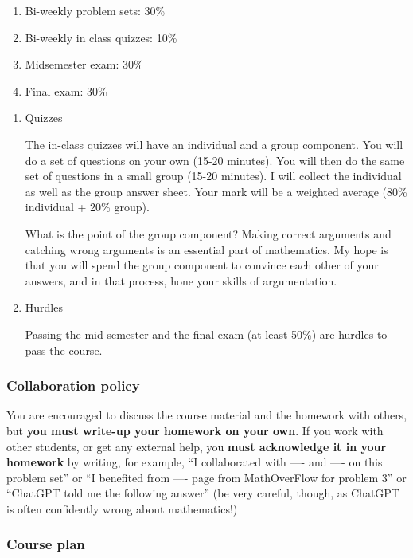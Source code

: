 \documentclass[11pt]{article}
\begin{document}
\begin{enumerate}
\item Bi-weekly problem sets: 30\%
\item Bi-weekly in class quizzes: 10\%
\item Midsemester exam: 30\%
\item Final exam: 30\%
\end{enumerate}
\begin{enumerate}
\item Quizzes
\label{sec:org0157920}

The in-class quizzes will have an individual and a group component.
You will do a set of questions on your own (15-20 minutes).
You will then do the same set of questions in a small group (15-20 minutes).
I will collect the individual as well as the group answer sheet.
Your mark will be a weighted average (80\% individual + 20\% group).

What is the point of the group component?
Making correct arguments and catching wrong arguments is an essential part of mathematics.
My hope is that you will spend the group component to convince each other of your answers, and in that process, hone your skills of argumentation. 
\item Hurdles
\label{sec:orgd8f242b}

Passing the mid-semester and the final exam (at least 50\%) are hurdles to pass the course.
\end{enumerate}
\subsubsection{Collaboration policy}
\label{sec:org739e62e}

You are encouraged to discuss the course material and the homework with others, but \textbf{you must write-up your homework on your own}.  If you work with other students, or get any external help, you \textbf{must acknowledge it in your homework} by writing, for example, ``I collaborated with ---- and ---- on this problem set'' or ``I benefited from ---- page from MathOverFlow for problem 3'' or ``ChatGPT told me the following answer''  (be very careful, though, as ChatGPT is often confidently wrong about mathematics!)
\subsubsection{Course plan}
\label{sec:org116ae29}
\end{document}
